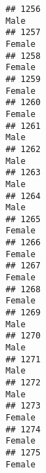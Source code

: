 \documentclass[]{article}
\begin{document}
\begin{verbatim}
## 1256                                                                                                                            Male
## 1257                                                                                                                          Female
## 1258                                                                                                                          Female
## 1259                                                                                                                          Female
## 1260                                                                                                                          Female
## 1261                                                                                                                            Male
## 1262                                                                                                                            Male
## 1263                                                                                                                            Male
## 1264                                                                                                                            Male
## 1265                                                                                                                          Female
## 1266                                                                                                                          Female
## 1267                                                                                                                          Female
## 1268                                                                                                                          Female
## 1269                                                                                                                            Male
## 1270                                                                                                                            Male
## 1271                                                                                                                            Male
## 1272                                                                                                                            Male
## 1273                                                                                                                          Female
## 1274                                                                                                                          Female
## 1275                                                                                                                          Female

\end{verbatim}
\end{document}
